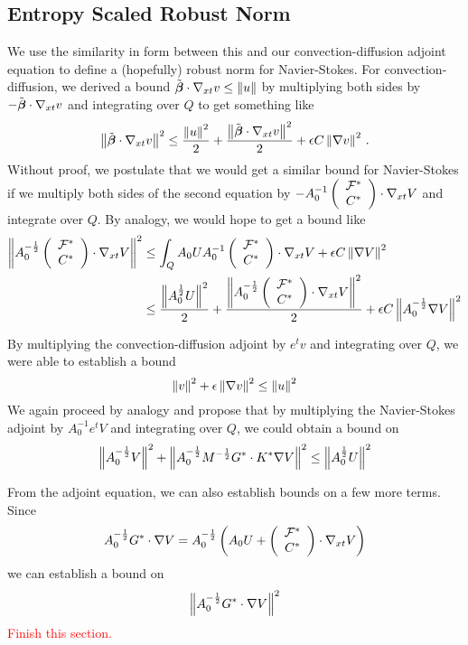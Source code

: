 \documentclass{article}
\begin{document}
\subsection*{Entropy Scaled Robust Norm}
We use the similarity in form between this and our convection-diffusion adjoint equation to define a (hopefully) robust norm
for Navier-Stokes.
For convection-diffusion, we derived a bound $\tilde{\boldsymbol\beta}\cdot\nabla_{xt} v\leq\left\| u \right\|$ by multiplying both sides by $-\tilde{\boldsymbol\beta}\cdot\nabla_{xt} v$
and integrating over $Q$ to get something like
\[
\left\| \tilde{\boldsymbol\beta}\cdot\nabla_{xt} v \right\|^2\leq\frac{\left\| u \right\|^2}{2}+\frac{\left\| \tilde{\boldsymbol\beta}\cdot\nabla_{xt} v \right\|^2}{2}+\epsilon C\left\| \nabla v \right\|^2\,.
\]
Without proof, we postulate that we would get a similar bound for Navier-Stokes if we multiply both sides of the 
second equation by $-A_0^{-1}\left( \begin{array}{c} \mathcal{F}^*\\ C^*\\ \end{array} \right)\cdot\nabla_{xt} V$ and integrate over $Q$.
By analogy, we would hope to get a bound like
\begin{align*}
\left\| A_0^{-\frac{1}{2}}\left( \begin{array}{c} \mathcal{F}^*\\ C^*\\ \end{array} \right)\cdot\nabla_{xt} V \right\|^2
&\leq\int_QA_0UA_0^{-1}\left( \begin{array}{c} \mathcal{F}^*\\ C^*\\ \end{array} \right)\cdot\nabla_{xt} V+\epsilon C\left\| \nabla V \right\|^2\\
&\leq\frac{\left\| A_0^{\frac{1}{2}}U \right\|^2}{2}+\frac{\left\| A_0^{-\frac{1}{2}}\left( \begin{array}{c} \mathcal{F}^*\\ C^*\\ \end{array} \right)\cdot\nabla_{xt} V \right\|^2}{2}
+\epsilon C\left\| A_0^{-\frac{1}{2}}\nabla V \right\|^2\\
\end{align*}

By multiplying the convection-diffusion adjoint by $e^tv$ and integrating over $Q$, we were able to establish a bound
\[
\left\| v \right\|^2+\epsilon\left\| \nabla v \right\|^2\leq\left\| u \right\|^2
\]
We again proceed by analogy and propose that by multiplying the Navier-Stokes adjoint by $A_0^{-1}e^tV$ and integrating over $Q$, we could obtain
a bound on 
\[
\left\| A_0^{-\frac{1}{2}}V \right\|^2+\left\| A_0^{-\frac{1}{2}}M^{-\frac{1}{2}}G^*\cdot K^*\nabla V \right\|^2\leq\left\| A_0^{\frac{1}{2}}U \right\|^2
\]

From the adjoint equation, we can also establish bounds on a few more terms. Since 
\[
A_0^{-\frac{1}{2}}G^*\cdot\nabla V=A_0^{-\frac{1}{2}}\left( A_0U+\left( \begin{array}{c} \mathcal{F}^*\\ C^*\\ \end{array} \right)\cdot\nabla_{xt} V \right)
\]
we can establish a bound on 
\[
\left\| A_0^{-\frac{1}{2}}G^*\cdot\nabla V \right\|^2
\]
\textcolor{red}{Finish this section.}
\end{document}
